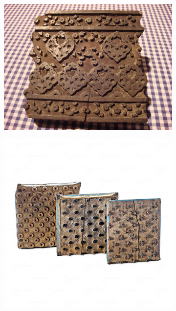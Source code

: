 \begin{figure}[h!]
	\centering
	\begin{subfigure}[b]{0.2\linewidth}
	  \includegraphics[width=\linewidth]{img/fábolkészült02.jpg}
	  \caption{}
	\end{subfigure}
	\begin{subfigure}[b]{0.2\linewidth}
	  \includegraphics[width=\linewidth]{img/fábolkészült 01.png}
	  \caption{}
	\end{subfigure}

\end{figure}
